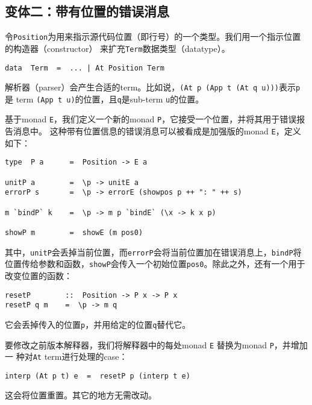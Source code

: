 \documentclass[12pt]{article}
\begin{document}
\subsection{变体二：带有位置的错误消息}\label{sec:err_msg_pos}
\indent{}令\texttt{Position}为用来指示源代码位置（即行号）的一个类型。我们用一个指示位置的构造器（constructor）
来扩充\texttt{Term}数据类型（datatype）。
\begin{verbatim}
data  Term  =  ... | At Position Term
\end{verbatim}
\noindent{}解析器（parser）会产生合适的term。比如说，\texttt{(At p (App t (At q u)))}表示\texttt{p}是
term \texttt{(App t u)}的位置，且\texttt{q}是sub-term \texttt{u}的位置。

\indent{}基于monad \texttt{E}，我们定义一个新的monad \texttt{P}，它接受一个位置，并将其用于错误报告消息中。
这种带有位置信息的错误消息可以被看成是加强版的monad \texttt{E}，定义如下：
\begin{verbatim}
type  P a      =  Position -> E a

unitP a        =  \p -> unitE a
errorP s       =  \p -> errorE (showpos p ++ ": " ++ s)

m `bindP` k    =  \p -> m p `bindE` (\x -> k x p)

showP m        =  showE (m pos0)
\end{verbatim}
\noindent{}其中，\texttt{unitP}会丢掉当前位置，而\texttt{errorP}会将当前位置加在错误消息上，\texttt{bindP}将
位置传给参数和函数，\texttt{showP}会传入一个初始位置\texttt{pos0}。除此之外，还有一个用于改变位置的函数：
\begin{verbatim}
resetP        ::  Position -> P x -> P x
resetP q m    =  \p -> m q
\end{verbatim}
\noindent{}它会丢掉传入的位置\texttt{p}，并用给定的位置\texttt{q}替代它。

\indent{}要修改之前版本解释器，我们将解释器中的每处monad \texttt{E} 替换为monad \texttt{P}，并增加一
种对\texttt{At} term进行处理的case：
\begin{verbatim}
interp (At p t) e  =  resetP p (interp t e)
\end{verbatim}
\noindent{}这会将位置重置。其它的地方无需改动。
\end{document}
